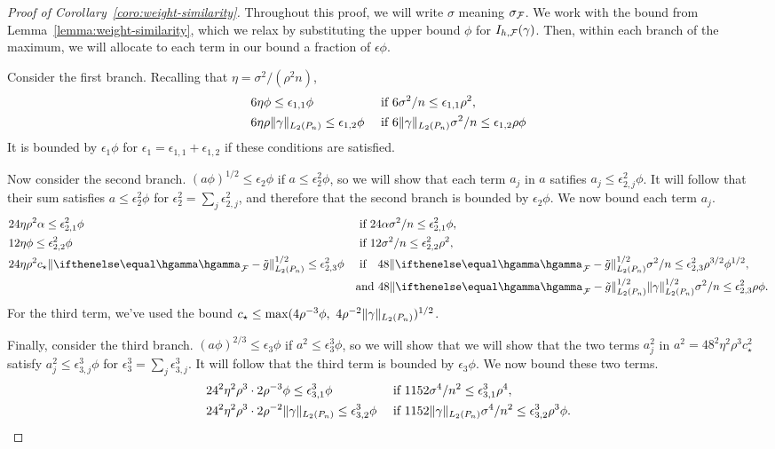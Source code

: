 \begin{proof}[Proof of Corollary~\ref{coro:weight-similarity}]
Throughout this proof, we will write $\sigma$ meaning $\sigma_{\mathcal{F}}$.
We work with the bound from Lemma~\ref{lemma:weight-similarity},
which we relax by substituting the upper bound $\phi$ for $I_{h,\mathcal{F}}(\gamma)$.
Then, within each branch of the maximum, we will allocate to each term in our bound a fraction of $\epsilon \phi$.


Consider the first branch. Recalling that $\eta = \sigma^2/(\rho^2 n)$,
\begin{align*}
&6\eta \phi \le \epsilon_{1,1} \phi 
    && \text{ if } 6\sigma^2/n \le \epsilon_{1,1} \rho^2, \\
&6\eta\rho\norm{\gamma}_{L_2(\Pn)} \le \epsilon_{1,2}  \phi
    && \text{ if } 6\norm{\gamma}_{L_2(\Pn)}\sigma^2/n \le \epsilon_{1,2} \rho \phi
\end{align*}
It is bounded by $\epsilon_1 \phi$ for $\epsilon_1 = \epsilon_{1,1}+\epsilon_{1,2}$ if these conditions are satisfied.


Now consider the second branch. $(a\phi)^{1/2} \le \epsilon_2 \phi$ if
$a \le \epsilon_2^2 \phi$, so we will show that each term $a_j$ in $a$ satifies
$a_j \le \epsilon_{2,j}^2 \phi$. It will follow that their sum satisfies
$a \le \epsilon_2^2 \phi$ for $\epsilon_2^2 = \sum_{j}\epsilon_{2,j}^2$,
and therefore that the second branch is bounded by $\epsilon_2 \phi$.
We now bound each term $a_j$.
\begin{align*} 
&24\eta\rho^2\alpha \le \epsilon_{2,1}^2 \phi
    && \text{ if } 24\alpha \sigma^2/n \le \epsilon_{2,1}^2 \phi, \\
&12\eta \phi \le \epsilon_{2,2}^2 \phi
    && \text{ if } 12\sigma^2/n \le \epsilon_{2,2}^2 \rho^2, \\
&24\eta \rho^2 c_{\star} \norm{\hriesz_{\F} - \gapprox}_{L_2(\Pn)}^{1/2} \le \epsilon_{2,3}^2  \phi
    && \text{ if }\ \  48\norm{\hriesz_{\F} - \gapprox}_{L_2(\Pn)}^{1/2}\sigma^2/n \le \epsilon_{2,3}^2 \rho^{3/2} \phi^{1/2},  \\
& && \text{and }    48\norm{\hriesz_{\F} - \gapprox}_{L_2(\Pn)}^{1/2}\norm{\gamma}_{L_2(\Pn)}^{1/2}\sigma^2/n \le \epsilon_{2,3}^2 \rho \phi.
\end{align*}
For the third term, we've used the bound $c_{\star} \le \max(4\rho^{-3}\phi,\ 4\rho^{-2}\norm{\gamma}_{L_2(\Pn)})^{1/2}$.


Finally, consider the third branch. $(a\phi)^{2/3} \le \epsilon_3 \phi$ if
$a^2 \le \epsilon_3^3 \phi$, so we will show that 
we will show that the two terms $a_j^2$ in $a^2=48^2\eta^2\rho^3c_{\star}^2$ 
satisfy $a_j^2 \le \epsilon_{3,j}^3 \phi$ for $\epsilon_3^3 = \sum_{j}\epsilon_{3,j}^3$.
It will follow that the third term is bounded by $\epsilon_3 \phi$.
We now bound these two terms.
\begin{align*}
& 24^2 \eta^2 \rho^3 \cdot 2 \rho^{-3} \phi \le \epsilon_{3,1}^3 \phi
&&\text{ if } 1152\sigma^4/n^2 \le \epsilon_{3,1}^3 \rho^4, \\
& 24^2 \eta^2 \rho^3 \cdot 2 \rho^{-2} \norm{\gamma}_{L_2(\Pn)} \le \epsilon_{3,2}^3 \phi
&&\text{ if } 1152\norm{\gamma}_{L_2(\Pn)}\sigma^4/n^2 \le \epsilon_{3,2}^3 \rho^3 \phi. 
\end{align*}



\end{proof}
